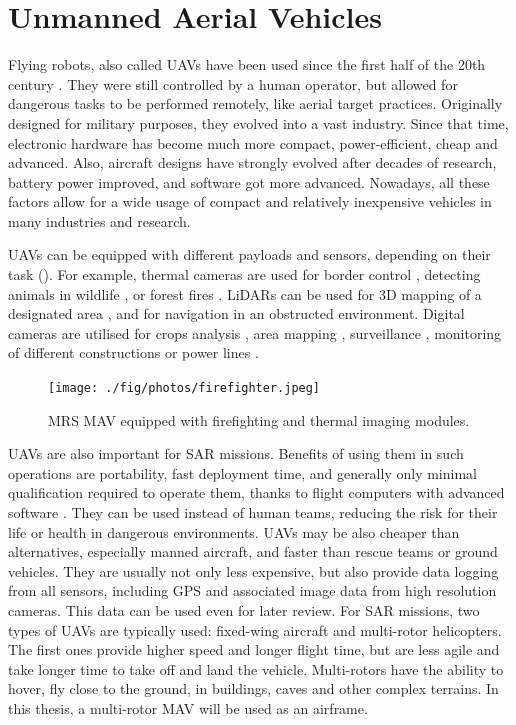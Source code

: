 \section{Unmanned Aerial Vehicles}
Flying robots, also called \acs{UAV}s have been used since the first half of the 20th century \cite{keane2013brief}. They were still controlled by a human operator, but allowed for dangerous tasks to be performed remotely, like aerial target practices. Originally designed for military purposes, they evolved into a vast industry. Since that time, electronic hardware has become much more compact, power-efficient, cheap and advanced. Also, aircraft designs have strongly evolved after decades of research, battery power improved, and software got more advanced. Nowadays, all these factors allow for a wide usage of compact and relatively inexpensive vehicles in many industries and research. 

\acs{UAV}s can be equipped with different payloads and sensors, depending on their task (). For example, thermal cameras are used for border control \cite{abushahma2019comparative, pedrozo2017swiss, girard2004border}, detecting animals in wildlife \cite{chretien2015wildlife, lhoest2015many}, or forest fires \cite{yuan2017fire, merino2005cooperative}. \acs{LiDAR}s can be used for 3D mapping of a designated area \cite{lin2019evaluation}, and for navigation in an obstructed environment. Digital cameras are utilised for crops analysis \cite{paredes2017multispectral, yue2018comparison}, area mapping \cite{nex2014uav}, surveillance \cite{girard2004border}, monitoring of different constructions or power lines \cite{zhang2017uav}. 


\begin{figure}[!h]
  \centering
  \texttt{[image: ./fig/photos/firefighter.jpeg]}

  \caption{\acs{MRS} \acs{MAV} equipped with firefighting and thermal imaging modules.}
  \label{fig:firefighter}
\end{figure}


\acs{UAV}s are also important for \ac{SAR} missions. Benefits of using them in such operations are portability, fast deployment time, and generally only minimal qualification required to operate them, thanks to flight computers with advanced software \cite{erdos2013experimental, goodrich2008supporting}. They can be used instead of human teams, reducing the risk for their life or health in dangerous environments. \acs{UAV}s may be also cheaper than alternatives, especially manned aircraft, and faster than rescue teams or ground vehicles. They are usually not only less expensive, but also provide data logging from all sensors, including \acs{GPS} and associated image data from high resolution cameras. This data can be used even for later review. For \acs{SAR} missions, two types of \acs{UAV}s are typically used: fixed-wing aircraft and multi-rotor helicopters. The first ones provide higher speed and longer flight time, but are less agile and take longer time to take off and land the vehicle. Multi-rotors have the ability to hover, fly close to the ground, in buildings, caves and other complex terrains. In this thesis, a multi-rotor \acs{MAV} will be used as an airframe. 


